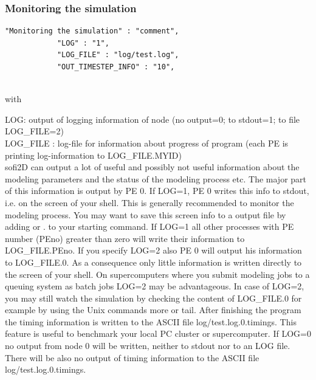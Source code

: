 \documentclass[11pt,onecolumn,oneside]{article}
\begin{document}

\subsubsection{Monitoring the simulation}
\begin{verbatim}
"Monitoring the simulation" : "comment",
			"LOG" : "1",	
			"LOG_FILE" : "log/test.log",
			"OUT_TIMESTEP_INFO" : "10",
			
\end{verbatim}

with

LOG: output of logging information of node (no output=0; to stdout=1; to file LOG\_FILE=2)\\
LOG\_FILE : log-file for information about progress of program (each PE is printing log-information to LOG\_FILE.MYID)\\


sofi2D can output a lot of useful and possibly not useful information about the modeling parameters and the status of the modeling process etc. The major part of this information is output by PE 0.
If LOG=1, PE 0 writes this info to stdout, i.e. on the screen of your shell. This is generally recommended  to monitor the modeling process. You may want to save this screen info to a output file by adding  or . to your starting command. If LOG=1 all other processes with PE number (PEno) greater than zero will write their information to LOG\_FILE.PEno. If you specify LOG=2 also PE 0 will output his information to LOG\_FILE.0. As a consequence only little information is written directly to the screen of your shell. On supercomputers where you submit modeling jobs to a queuing system as batch jobs LOG=2 may be advantageous. In case of LOG=2, you may still watch the simulation by checking the content of LOG\_FILE.0 for example by using the Unix commands more or tail. After finishing the program the timing information is written to the ASCII file log/test.log.0.timings. This feature is useful to benchmark your local PC cluster or supercomputer. If LOG=0 no output from node 0 will be written, neither to stdout nor to an LOG file. There will be also no output of timing information to the ASCII file log/test.log.0.timings. 
\end{document}
